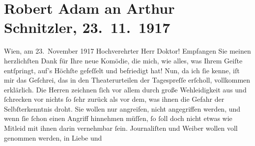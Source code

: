 

         
         \newcommand{\erwaehntePersonen}{Personen: }
         \newcommand{\erwaehnteInstitutionen}{}
         \newcommand{\erwaehnteOrte}{Orte: Wien}
         \newcommand{\erwaehnteWerke}{Werke: Fink und Fliederbusch. Komödie in drei Akten}
               \section[Robert Adam an Arthur Schnitzler, 23. 11. 1917]{ Robert Adam an Arthur Schnitzler, 23. 11. 1917}\nopagebreak{}\rehead{ }\begin{ledgroupsized}[t]{13cm}\normalsize\beginnumbering \toendnotes[C]{\smallbreak\pagebreak[2]} 
\toendnotes[C]{\smallbreak}\pstart
           \raggedleft{}{\pb}Wien, am 23. November 1917\pend
           \pstart\center{}Hochverehrter Herr Doktor!\pend\pstart
           Empfangen Sie meinen herzlichſten Dank für Ihre neue Komödie, die mich, wie alles, was Ihrem Geiſte entſpringt,
               auf’s Höchſte gefeſſelt und befriedigt hat!\pend
           \pstart
           Nun, da ich ſie kenne, iſt mir das Geſchrei, das in den Theaterurteilen der
               Tagespreſſe erſcholl, vollkommen erklärlich. Die Herren zeichnen ſich vor allem durch
               große Wehleidigkeit aus und ſchrecken vor nichts ſo ſehr zurück als vor dem, was
               ihnen die Gefahr der Selbſterkenntnis droht. Sie wollen nur angreifen, nicht
               angegriffen werden, und wenn ſie ſchon einen Angriff hinnehmen müſſen, ſo ſoll doch
               nicht etwas wie Mitleid mit ihnen {\pb}darin
               vernehmbar ſein. Journaliſten und Weiber wollen voll genommen werden, in Liebe und

\end{ledgroupsized}
